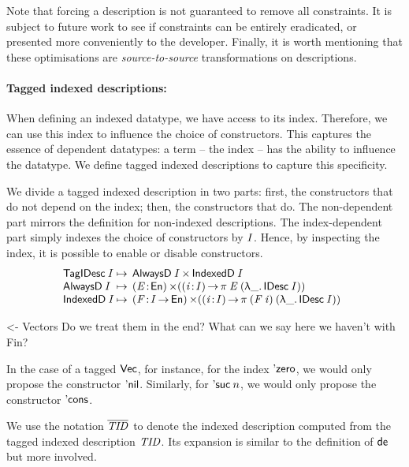 Note that forcing a description is not guaranteed to remove all
constraints. It is subject to future work to see if constraints can be
entirely eradicated, or presented more conveniently to the developer.
Finally, it is worth mentioning that these optimisations are
\emph{source-to-source} transformations on descriptions.

\paragraph{Tagged indexed descriptions:}

When defining an indexed datatype, we have access to its
index. Therefore, we can use this index to influence the choice of
constructors. This captures the essence of dependent datatypes: a
term -- the index -- has the ability to influence the datatype. We
define tagged indexed descriptions to capture this specificity.

We divide a tagged indexed description in two parts: first, the
constructors that do not depend on the index; then, the constructors
that do. The non-dependent part mirrors the definition for non-indexed
descriptions. The index-dependent part simply indexes the choice of
constructors by $\V{I}$. Hence, by inspecting the index, it is
possible to enable or disable constructors.
%
\[
\begin{array}{@{}l@{\:\mapsto\:\:}l}
 \TagIDesc{\V{I}}  & \TIMES{\ATagIDesc{\V{I}}}{\ITagIDesc{\V{I}}} \\
 \ATagIDesc{\V{I}} & \SIGMA{\V{E}}{\EnumU} (\PI{\V{i}}{\V{I}} \spi{\V{E}}{(\LAM{\_} \IDesc{\V{I}})}) \\
 \ITagIDesc{\V{I}} & 
     \SIGMA{\V{F}}{\V{I} \To \EnumU} (\PI{\V{i}}{\V{I}} \spi{(\V{F}\: \V{i})}{(\LAM{\_} \IDesc{\V{I}})}) 
\end{array}
\]

\begin{wstructure}
<- Vectors
    Do we treat them in the end? 
    What can we say here we haven't with Fin?
\end{wstructure}

In the case of a tagged $\D{Vec}$, for instance, for the index
$\NatZero$, we would only propose the constructor
$\ListNil$. Similarly, for $\NatSuc{n}$, we would only propose the
constructor $\SYMBListCons$.

We use the notation $\toIDesc{\V{TID}}$ to denote the
indexed description computed from the tagged indexed description
$\V{TID}$. Its expansion is similar to the definition of \(\SYMBtoDesc\)
but more involved.
 
